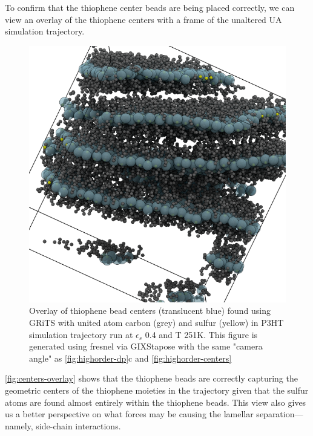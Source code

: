 To confirm that the thiophene center beads are being placed correctly, we can view an overlay of the thiophene centers with a frame of the unaltered UA simulation trajectory.
\begin{figure}
    \centering
    \includegraphics[width=0.8\linewidth]{figures/p3ht_val/cg-overlay_scene.png}
    \caption{Overlay of thiophene bead centers (translucent blue) found using GRiTS with united atom carbon (grey) and sulfur (yellow) in P3HT simulation trajectory run at $\epsilon_{s}$ 0.4 and T 251K. This figure is generated using fresnel via GIXStapose with the same "camera angle" as \autoref{fig:highorder-dp}c and \autoref{fig:highorder-centers}}\label{fig:centers-overlay}
\end{figure}
\autoref{fig:centers-overlay} shows that the thiophene beads are correctly capturing the geometric centers of the thiophene moieties in the trajectory given that the sulfur atoms are found almost entirely within the thiophene beads. This view also gives us a better perspective on what forces may be causing the lamellar separation---namely, side-chain interactions.

